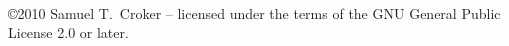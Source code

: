 \documentclass{article}
\begin{document}
\begin{multicols}{3}
\vskip 10pt

\vbox{
}

\vskip 10pt

\vbox{
}

\vskip 10pt

\vbox{\
}

\vskip 10pt

\vbox{
}

\vskip 10pt

\vbox{
}

\end{multicols}

\vspace{\fill}
\copyright 2010 Samuel T.\ Croker -- licensed under the terms of the GNU
General Public License 2.0 or later.
\end{document}

